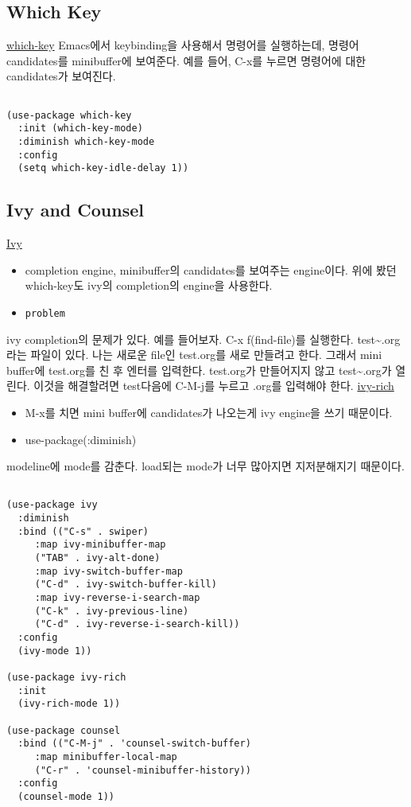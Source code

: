 \documentclass[11pt]{article}
\begin{document}
\subsection*{Which Key}
\label{sec:orge572770}

\href{https://github.com/justbur/emacs-which-key}{which-key} 
Emacs에서 keybinding을 사용해서 명령어를 실행하는데, 명령어 candidates를 minibuffer에 보여준다. 예를 들어, C-x를 누르면 명령어에 대한 candidates가 보여진다.

\begin{verbatim}

(use-package which-key
  :init (which-key-mode)
  :diminish which-key-mode
  :config
  (setq which-key-idle-delay 1))

\end{verbatim}

\subsection*{Ivy and Counsel}
\label{sec:orgdfc3547}

\href{https://oremacs.com/swiper/}{Ivy} 
\begin{itemize}
\item completion engine, minibuffer의 candidates를 보여주는 engine이다. 위에 봤던 which-key도 ivy의 completion의 engine을 사용한다.
\item \texttt{problem}
\end{itemize}
ivy completion의 문제가 있다. 예를 들어보자. C-x f(find-file)를 실행한다. test\textasciitilde{}.org라는 파일이 있다. 나는 새로운 file인 test.org를 새로 만들려고 한다. 그래서 mini buffer에 test.org를 친 후 엔터를 입력한다. test.org가 만들어지지 않고 test\textasciitilde{}.org가 열린다. 이것을 해결할려면 test다음에  C-M-j를 누르고 .org를 입력해야 한다.
\href{https://github.com/Yevgnen/ivy-rich}{ivy-rich} 
\begin{itemize}
\item M-x를 치면 mini buffer에 candidates가 나오는게 ivy engine을 쓰기 때문이다.

\item use-package(:diminish)
\end{itemize}
modeline에 mode를 감춘다. load되는 mode가 너무 많아지면 지저분해지기 때문이다.

\begin{verbatim}

(use-package ivy
  :diminish
  :bind (("C-s" . swiper)
	 :map ivy-minibuffer-map
	 ("TAB" . ivy-alt-done)
	 :map ivy-switch-buffer-map
	 ("C-d" . ivy-switch-buffer-kill)
	 :map ivy-reverse-i-search-map
	 ("C-k" . ivy-previous-line)
	 ("C-d" . ivy-reverse-i-search-kill))
  :config
  (ivy-mode 1))

(use-package ivy-rich
  :init
  (ivy-rich-mode 1))

(use-package counsel
  :bind (("C-M-j" . 'counsel-switch-buffer)
	 :map minibuffer-local-map
	 ("C-r" . 'counsel-minibuffer-history))
  :config
  (counsel-mode 1))

\end{verbatim}
\end{document}
